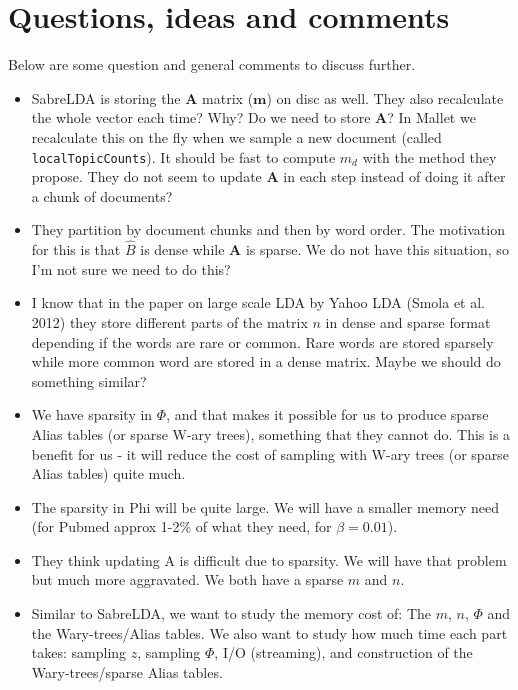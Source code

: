 \documentclass{article}
\begin{document}
\section{Questions, ideas and comments}

Below are some question and general comments to discuss further.

\begin{itemize}
  \item SabreLDA is storing the $\mathbf{A}$ matrix ($\mathbf{m}$) on disc as well. They also recalculate the whole vector each time? Why? Do we need to store $\mathbf{A}$? In Mallet we recalculate this on the fly when we sample a new document (called \texttt{localTopicCounts}). It should be fast to compute $m_d$ with the method they propose. They do not seem to update $\mathbf{A}$ in each step instead of doing it after a chunk of documents?
  \item They partition by document chunks and then by word order. The motivation for this is that $\hat{B}$ is dense while $\mathbf{A}$ is sparse. We do not have this situation, so I'm not sure we need to do this?
  \item I know that in the paper on large scale LDA by Yahoo LDA (Smola et al. 2012) they store different parts of the matrix $n$ in dense and sparse format depending if the words are rare or common. Rare words are stored sparsely while more common word are stored in a dense matrix. Maybe we should do something similar?
  \item We have sparsity in $\Phi$, and that makes it possible for us to produce sparse Alias tables (or sparse W-ary trees), something that they cannot do. This is a benefit for us - it will reduce the cost of sampling with W-ary trees (or sparse Alias tables) quite much.
  \item The sparsity in Phi will be quite large. We will have a smaller memory need (for Pubmed approx 1-2\% of what they need, for $\beta = 0.01$).
  \item They think updating A is difficult due to sparsity. We will have that problem but much more aggravated. We both have a sparse $m$ and $n$. 
  \item Similar to SabreLDA, we want to study the memory cost of: The $m$, $n$, $\Phi$ and the Wary-trees/Alias tables. We also want to study how much time each part takes: sampling $z$, sampling $\Phi$, I/O (streaming), and construction of the Wary-trees/sparse Alias tables.
\end{itemize}
\end{document}
